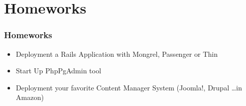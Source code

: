 \documentclass{beamer}
\begin{document}
\section{Homeworks}
\begin{frame}
  \frametitle{Homeworks}
  \begin{itemize}
    \item Deployment a Rails Application with Mongrel, Passenger or Thin
    \item Start Up PhpPgAdmin tool
    \item Deployment your favorite Content Manager System (Joomla!, Drupal \dots in Amazon)
  \end{itemize}
\end{frame}
\end{document}
